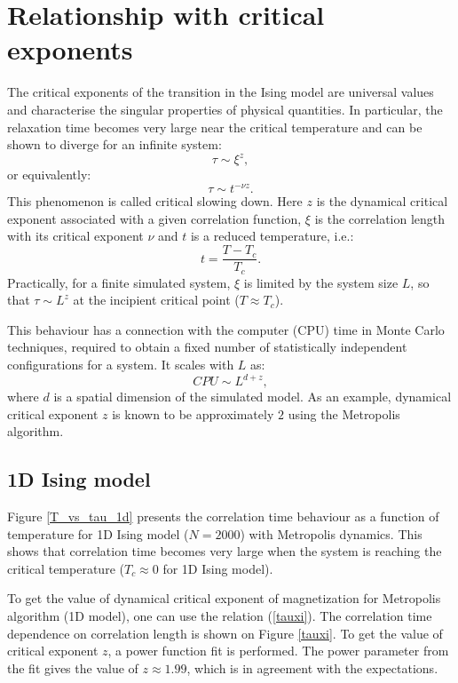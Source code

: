 \documentclass[11pt,a4paper]{article}%
\begin{document}
\section{Relationship with critical exponents}
 The critical exponents of the transition in the Ising model are universal values and characterise the singular properties of physical quantities. In particular, the relaxation time becomes very large near the critical temperature and can be shown to diverge for an infinite system:
\begin{equation}
\tau \sim \xi^z  ,
\label{tauxi}
\end{equation}
or equivalently:
\begin{equation}
\tau \sim t^{-\nu z} .
\label{tauxi2}
\end{equation}
This phenomenon is called critical slowing down. Here $z$ is the dynamical critical exponent associated with a given correlation function, $\xi$ is the correlation length with its critical exponent $\nu$ and $t$ is a reduced temperature, i.e.:
\begin{equation}
t=\dfrac{T-T_c}{T_c} . 
 \end{equation}
Practically, for a finite simulated system, $\xi$ is limited by
the system size $L$, so that $\tau \sim L^z $
at the incipient critical point ($T \approx T_c$). 

This behaviour has a connection with the computer (CPU) time in Monte Carlo techniques, required to obtain a fixed number of statistically independent configurations for a system. It scales with $L$ as:
\begin{equation}
CPU \sim L^{d+z} ,
\end{equation}
where $d$ is a spatial dimension of the simulated model. As an example, dynamical critical exponent $z$ is known to be approximately $2$ using the Metropolis algorithm.

\subsection{1D Ising model}
Figure \ref{T_vs_tau_1d} presents the correlation time behaviour as a function of temperature for 1D Ising model ($N=2000$) with Metropolis dynamics. This shows that correlation time becomes very large when the system is reaching the critical temperature ($T_c \approx 0$ for 1D Ising model).

To get the value of dynamical critical exponent of magnetization for Metropolis algorithm (1D model), one can use the relation (\ref{tauxi}). The correlation time dependence on correlation length is shown on Figure \ref{tauxi}. To get the value of critical exponent $z$, a power function fit is performed. The power parameter from the fit gives the value of $z \approx 1.99$, which is in agreement with the expectations.
\end{document}
